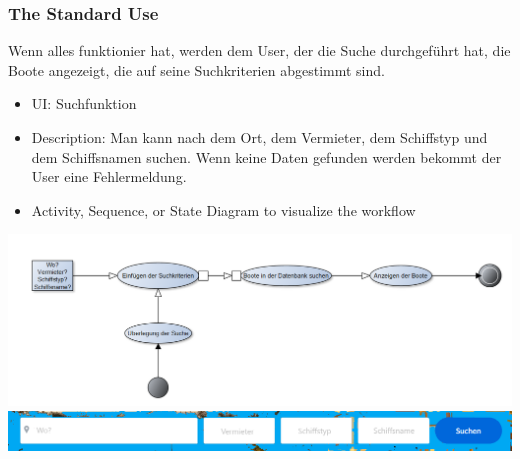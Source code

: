 \documentclass[12pt]{article}
\theoremstyle{definition}
\begin{document}
\subsubsection{The Standard Use}
Wenn alles funktionier hat, werden dem User, der die Suche durchgeführt hat, die Boote angezeigt, die auf seine Suchkriterien abgestimmt sind.
\begin{itemize}
	\item UI: Suchfunktion
	\item Description: Man kann nach dem Ort, dem Vermieter, dem Schiffstyp und dem Schiffsnamen suchen. Wenn keine Daten gefunden werden bekommt der User eine Fehlermeldung.
	\item Activity, Sequence, or State Diagram to visualize the workflow
\end{itemize}
\includegraphics[height=0.40\textwidth]{Aktivitaetsdiagramm.PNG}
\includegraphics[height=0.40\textwidth]{Startseite2.PNG}
\end{document}
